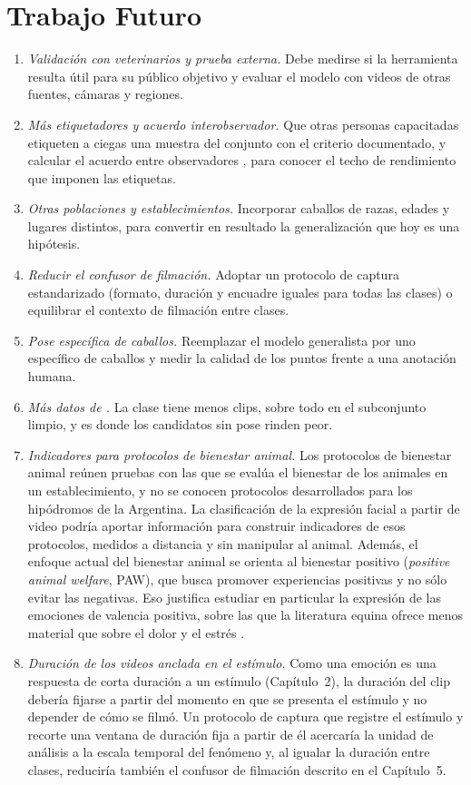 \section{Trabajo Futuro}
\begin{enumerate}
  \item \textit{Validación con veterinarios y prueba externa.} Debe medirse si la herramienta resulta útil para su público objetivo y evaluar el modelo con videos de otras fuentes, cámaras y regiones.
  \item \textit{Más etiquetadores y acuerdo interobservador.} Que otras personas capacitadas etiqueten a ciegas una muestra del conjunto con el criterio documentado, y calcular el acuerdo entre observadores \parencite{cohen1960}, para conocer el techo de rendimiento que imponen las etiquetas.
  \item \textit{Otras poblaciones y establecimientos.} Incorporar caballos de razas, edades y lugares distintos, para convertir en resultado la generalización que hoy es una hipótesis.
  \item \textit{Reducir el confusor de filmación.} Adoptar un protocolo de captura estandarizado (formato, duración y encuadre iguales para todas las clases) o equilibrar el contexto de filmación entre clases.
  \item \textit{Pose específica de caballos.} Reemplazar el modelo generalista por uno específico de caballos y medir la calidad de los puntos frente a una anotación humana.
  \item \textit{Más datos de .} La clase tiene menos clips, sobre todo en el subconjunto limpio, y es donde los candidatos sin pose rinden peor.
  \item \textit{Indicadores para protocolos de bienestar animal.} Los protocolos de bienestar animal reúnen pruebas con las que se evalúa el bienestar de los animales en un establecimiento, y no se conocen protocolos desarrollados para los hipódromos de la Argentina. La clasificación de la expresión facial a partir de video podría aportar información para construir indicadores de esos protocolos, medidos a distancia y sin manipular al animal. Además, el enfoque actual del bienestar animal se orienta al bienestar positivo (\textit{positive animal welfare}, PAW), que busca promover experiencias positivas y no sólo evitar las negativas. Eso justifica estudiar en particular la expresión de las emociones de valencia positiva, sobre las que la literatura equina ofrece menos material que sobre el dolor y el estrés \parencite{lansade2018}.
  \item \textit{Duración de los videos anclada en el estímulo.} Como una emoción es una respuesta de corta duración a un estímulo (Capítulo~2), la duración del clip debería fijarse a partir del momento en que se presenta el estímulo y no depender de cómo se filmó. Un protocolo de captura que registre el estímulo y recorte una ventana de duración fija a partir de él acercaría la unidad de análisis a la escala temporal del fenómeno y, al igualar la duración entre clases, reduciría también el confusor de filmación descrito en el Capítulo~5.

\end{enumerate}
